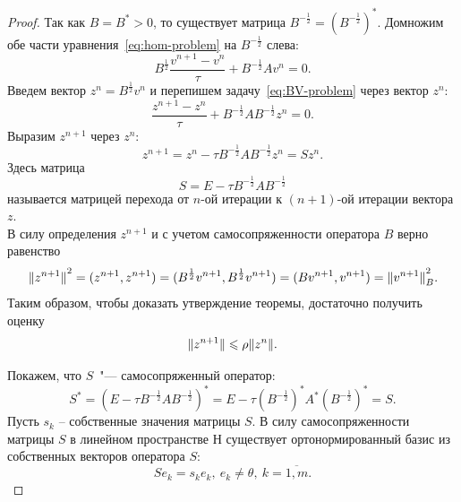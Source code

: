 \documentclass[11pt,a4paper,twoside,listtotoc,bibtotoc]{report}
\numberwithin{equation}{section}
\theoremstyle{definition}
\theoremstyle{plain}
\DeclarePairedDelimiter\norm{\lVert}{\rVert}
\begin{document}
\begin{proof}
    Так как $B = B^\ast > 0$, то существует матрица $B^{-\frac{1}{2}} =
    \left(B^{-\frac{1}{2}}\right)^*$. Домножим обе части уравнения~\eqref{eq:hom-problem}
    на $B^{-\frac{1}{2}}$ слева:
    \begin{equation}
        \label{eq:BV-problem}
        B^{\frac{1}{2}}\frac{v^{n+1} - v^n}{\tau} + B^{-\frac{1}{2}}Av^n = 0.
    \end{equation}
    Введем вектор $z^n = B^{\frac{1}{2}}v^n$ и перепишем задачу~\eqref{eq:BV-problem}
    через вектор $z^n$:
    $$
        \frac{z^{n+1} - z^n}{\tau} + B^{-\frac{1}{2}}AB^{-\frac{1}{2}}z^n = 0.
    $$
    Выразим $z^{n+1}$ через $z^n$:
    $$
        z^{n+1} = z^n - \tau B^{-\frac{1}{2}}AB^{-\frac{1}{2}}z^n = Sz^n.
    $$
    Здесь матрица
    \begin{equation}
        \label{eq:S-eq}
        S = E - \tau B^{-\frac{1}{2}}AB^{-\frac{1}{2}}
    \end{equation}
    называется матрицей перехода от $n$-ой итерации к $(n+1)$-ой итерации вектора $z$.
    \\
    В силу определения $z^{n+1}$ и с учетом самосопряженности оператора $B$ верно равенство
    $$
        {\norm{z^{n+1}}}^2 = (z^{n+1}, z^{n+1}) =
        (B^{\frac{1}{2}}v^{n+1}, B^{\frac{1}{2}}v^{n+1}) = (Bv^{n+1}, v^{n+1}) =
        {\norm{v^{n+1}}}_B^2.
    $$
    Таким образом, чтобы доказать утверждение теоремы, достаточно получить оценку
    $$
        {\norm{z^{n+1}}} \leqslant \rho {\norm{z^n}}.
    $$

    Покажем, что $S$~"--- самосопряженный оператор:
    $$
        S^* = \left(E - \tau B^{-\frac{1}{2}}AB^{-\frac{1}{2}}\right)^* =
        E - \tau \left(B^{-\frac{1}{2}}\right)^* A^* \left(B^{-\frac{1}{2}}\right)^* = S.
    $$
    Пусть $s_k$ -- собственные значения матрицы $S$.
    В силу самосопряженности матрицы $S$ в линейном пространстве $Н$
    существует ортонормированный базис из собственных векторов оператора $S$:
    \begin{equation}
        \label{eq:S-basis}
        Se_k = s_ke_k, ~e_k \neq \theta, ~k = \overline{1,m}.
    \end{equation}


\end{proof}
\end{document}
